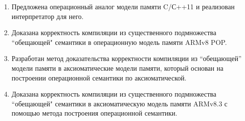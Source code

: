 {}
\begin{enumerate}
  \item Предложена операционный аналог модели памяти C/С++11 и реализован интерпретатор для него.
  \item Доказана корректность компиляции из существенного подмножества ``обещающей" \; семантики в операционную модель памяти ARMv8 POP.
  \item Разработан метод доказательства корректности компиляции из ``обещающей'' модели памяти в аксиоматические модели памяти,
        который основан на построении операционной семантики по аксиоматической.
  \item Доказана корректность компиляции из существенного подмножества ``обещающей" \; семантики в аксиоматическую модель памяти ARMv8.3
  с помощью метода построения операционной семантики.
\end{enumerate}

